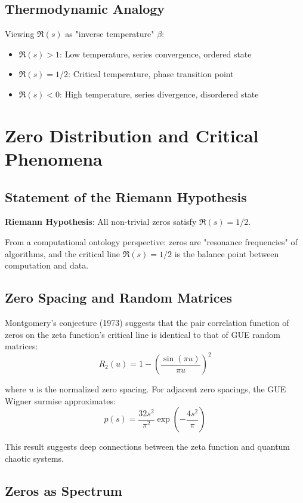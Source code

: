 \documentclass[11pt]{article}
\begin{document}
\subsection{Thermodynamic Analogy}

Viewing $\Re(s)$ as "inverse temperature" $\beta$:
\begin{itemize}
\item $\Re(s) > 1$: Low temperature, series convergence, ordered state
\item $\Re(s) = 1/2$: Critical temperature, phase transition point
\item $\Re(s) < 0$: High temperature, series divergence, disordered state
\end{itemize}

\section{Zero Distribution and Critical Phenomena}

\subsection{Statement of the Riemann Hypothesis}

\textbf{Riemann Hypothesis}: All non-trivial zeros satisfy $\Re(s) = 1/2$.

From a computational ontology perspective: zeros are "resonance frequencies" of algorithms, and the critical line $\Re(s) = 1/2$ is the balance point between computation and data.

\subsection{Zero Spacing and Random Matrices}

Montgomery's conjecture (1973) suggests that the pair correlation function of zeros on the zeta function's critical line is identical to that of GUE random matrices:
$$R_2(u) = 1 - \left(\frac{\sin(\pi u)}{\pi u}\right)^2$$

where $u$ is the normalized zero spacing. For adjacent zero spacings, the GUE Wigner surmise approximates:
$$p(s) = \frac{32 s^2}{\pi^2} \exp\left(-\frac{4 s^2}{\pi}\right)$$

This result suggests deep connections between the zeta function and quantum chaotic systems.

\subsection{Zeros as Spectrum}
\end{document}
